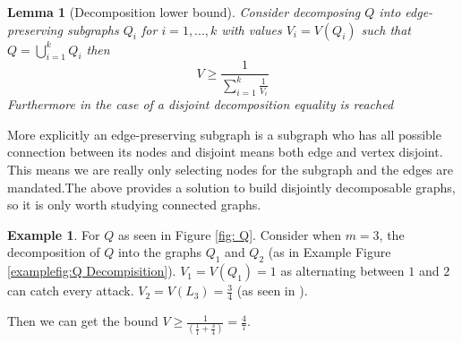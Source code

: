 \documentclass[a4paper,10pt]{article}
\newtheorem{lemma}[theorem]{Lemma}
\theoremstyle{definition}
\theoremstyle{definition}
\newtheorem{example}[theorem]{Example}
\theoremstyle{remark}
\theoremstyle{definition}
\begin{document}
\begin{lemma}[Decomposition lower bound]
Consider decomposing $Q$ into edge-preserving subgraphs $Q_{i}$ for $i=1,...,k$ with values $V_{i}=V(Q_{i})$ such that $Q=\bigcup\limits_{i=1}^{k} Q_{i}$ then
$$V \geq \frac{1}{\sum\limits_{i=1}^{k} \frac{1}{V_{i}}} $$
Furthermore in the case of a disjoint decomposition equality is reached
\end{lemma}

More explicitly an edge-preserving subgraph is a subgraph who has all possible connection between its nodes and disjoint means both edge and vertex disjoint. This means we are really only selecting nodes for the subgraph and the edges are mandated.The above provides a solution to build disjointly decomposable graphs, so it is only worth studying connected graphs.


\begin{example}
For $Q$ as seen in Figure \ref{fig: Q}. Consider when $m=3$, the decomposition of $Q$ into the graphs $Q_{1}$ and $Q_{2}$ (as in Example Figure \ref{examplefig:Q Decompisition}). $V_{1}=V(Q_{1})=1$ as alternating between $1$ and $2$ can catch every attack. $V_{2}=V(L_{3})=\frac{3}{4}$ (as seen in \cite{Alpern2011} ). 

Then we can get the bound $V \geq \frac{1}{(\frac{1}{1}+\frac{3}{4})}=\frac{4}{7}$.
\end{example}

\begin{myfigure}
\begin{center}
\end{center}
\caption{Decomposition of Q into \textcolor{blue}{$Q_{1}$} and \textcolor{red}{$Q_{2}$}.}
\label{examplefig:Q Decompisition}
\end{myfigure}
\end{document}
